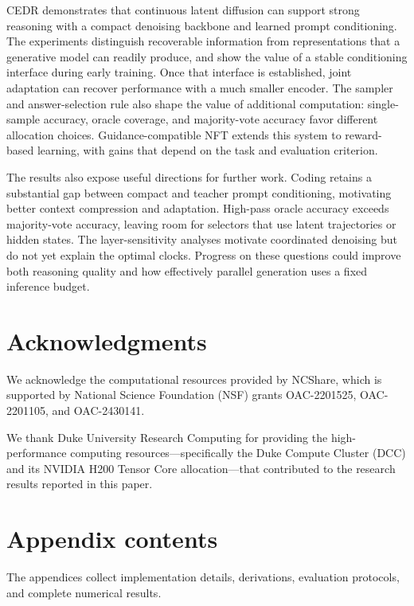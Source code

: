 \documentclass[11pt,letterpaper]{article}
\begin{document}
CEDR demonstrates that continuous latent diffusion can support strong reasoning with a compact denoising backbone and learned prompt conditioning. The experiments distinguish recoverable information from representations that a generative model can readily produce, and show the value of a stable conditioning interface during early training. Once that interface is established, joint adaptation can recover performance with a much smaller encoder. The sampler and answer-selection rule also shape the value of additional computation: single-sample accuracy, oracle coverage, and majority-vote accuracy favor different allocation choices. Guidance-compatible NFT extends this system to reward-based learning, with gains that depend on the task and evaluation criterion.

The results also expose useful directions for further work. Coding retains a substantial gap between compact and teacher prompt conditioning, motivating better context compression and adaptation. High-pass oracle accuracy exceeds majority-vote accuracy, leaving room for selectors that use latent trajectories or hidden states. The layer-sensitivity analyses motivate coordinated denoising but do not yet explain the optimal clocks. Progress on these questions could improve both reasoning quality and how effectively parallel generation uses a fixed inference budget.

\section*{Acknowledgments}

We acknowledge the computational resources provided by NCShare, which is supported by National Science Foundation (NSF) grants OAC-2201525, OAC-2201105, and OAC-2430141.

We thank Duke University Research Computing for providing the high-performance computing resources---specifically the Duke Compute Cluster (DCC) and its NVIDIA H200 Tensor Core allocation---that contributed to the research results reported in this paper.

\clearpage



\clearpage
\appendix
\section*{Appendix contents}
\label{app:contents}

The appendices collect implementation details, derivations, evaluation protocols, and complete numerical results.
\end{document}
